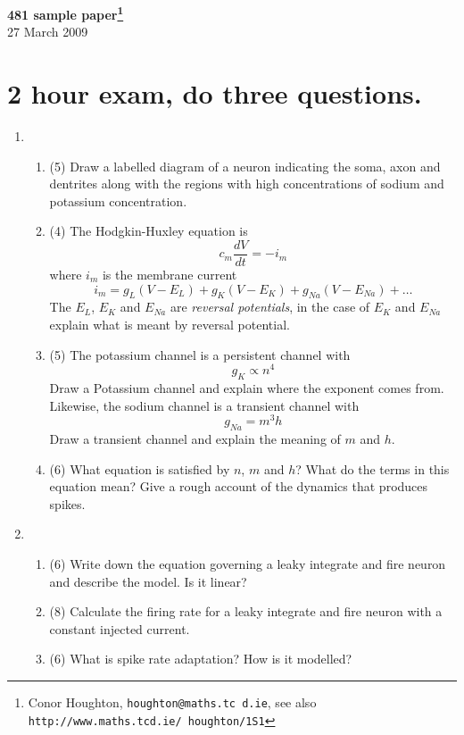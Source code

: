 \documentclass[12pt]{article}
\begin{document}
\begin{center}
{\bf 481 sample paper\footnote{Conor Houghton, {\tt houghton@maths.tc
d.ie}, see also {\tt http://www.maths.tcd.ie/ houghton/1S1}}}\\[1cm]{} 27 March 2009
\end{center}

\section*{2 hour exam, do three questions.}

\begin{enumerate}
\item 
\begin{enumerate}
\item (5) Draw a labelled diagram of a neuron indicating the soma,
  axon and dentrites along with the regions with high concentrations
  of sodium and potassium concentration.
\item (4) The Hodgkin-Huxley equation is
\begin{equation}
c_m\frac{dV}{dt}=-i_m
\end{equation}
where $i_m$ is the membrane current
\begin{equation}
i_m=g_L(V-E_L)+g_K(V-E_K)+g_{Na}(V-E_{Na})+\ldots
\end{equation}
The $E_L$, $E_K$ and $E_{Na}$ are {\sl reversal potentials}, in the
case of $E_K$ and $E_{Na}$ explain what is meant by reversal
potential.
\item (5) The potassium channel is a persistent channel with
\begin{equation}
g_{K}\propto n^4
\end{equation}
Draw a Potassium channel and explain where the exponent comes from. Likewise, the sodium channel is a transient channel with
\begin{equation}
g_{Na}=m^3h
\end{equation}
Draw a transient channel and explain the meaning of $m$ and $h$.
\item (6) What equation is satisfied by $n$, $m$ and $h$? What do the terms in this equation mean? Give a rough account of the dynamics that produces spikes.
\end{enumerate}


\item 
\begin{enumerate} 
\item (6) Write down the equation governing a leaky integrate and fire neuron and describe the model. Is it linear?
\item (8) Calculate the firing rate for a leaky integrate and fire neuron with a constant injected current.
\item (6) What is spike rate adaptation? How is it modelled?
\end{enumerate}


\end{enumerate}
\end{document}
